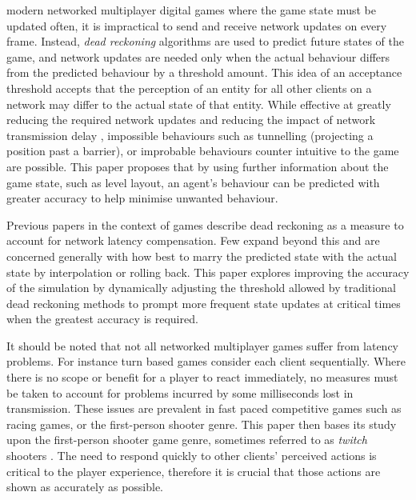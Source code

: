\documentclass[journal]{IEEEtran}
\begin{document}
 modern networked multiplayer digital games where the game state must be updated often, it is impractical to send and receive network updates on every frame. Instead, \textit{dead reckoning} algorithms are used to predict future states of the game, and network updates are needed only when the actual behaviour differs from the predicted behaviour by a threshold amount. This idea of an acceptance threshold accepts that the perception of an entity for all other clients on a network may differ to the actual state of that entity. While effective at greatly reducing the required network updates and reducing the impact of network transmission delay \cite{pantel2002suitability}, impossible behaviours such as tunnelling (projecting a position past a barrier), or improbable behaviours counter intuitive to the game are possible. This paper proposes that by using further information about the game state, such as level layout, an agent's behaviour can be predicted with greater accuracy to help minimise unwanted behaviour.

Previous papers in the context of games describe dead reckoning as a measure to account for network latency compensation. Few expand beyond this and are concerned generally with how best to marry the predicted state with the actual state by interpolation or rolling back. This paper explores improving the accuracy of the simulation by dynamically adjusting the threshold allowed by traditional dead reckoning methods to prompt more frequent state updates at critical times when the greatest accuracy is required.

It should be noted that not all networked multiplayer games suffer from latency problems. For instance turn based games consider each client sequentially. Where there is no scope or benefit for a player to react immediately, no measures must be taken to account for problems incurred by some milliseconds lost in transmission. These issues are prevalent in fast paced competitive games such as racing games, or the first-person shooter genre. This paper then bases its study upon the first-person shooter game genre, sometimes referred to as \textit{twitch} shooters \cite{lee2015outatime}. The need to respond quickly to other clients' perceived actions is critical to the player experience, therefore it is crucial that those actions are shown as accurately as possible.
\end{document}

